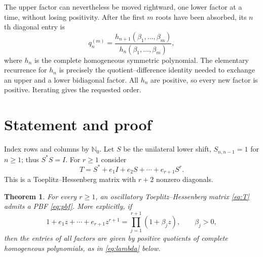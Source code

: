 \documentclass[11pt]{article}
\newtheorem{theorem}{Theorem}
\newcommand{\N}{\mathbb N}
\begin{document}
The upper factor can nevertheless be moved rightward, one lower factor at a
time, without losing positivity.  After the first $m$ roots have been
absorbed, its $n$th diagonal entry is
\[
 q_n^{(m)}=\frac{h_{n+1}(\beta_1,\ldots,\beta_m)}
                  {h_n(\beta_1,\ldots,\beta_m)},
\]
where $h_n$ is the complete homogeneous symmetric polynomial.  The elementary
recurrence for $h_n$ is precisely the quotient--difference identity needed
to exchange an upper and a lower bidiagonal factor.  All $h_n$ are positive,
so every new factor is positive.  Iterating gives the requested order.

\section{Statement and proof}
Index rows and columns by $\N_0$.  Let $S$ be the unilateral lower shift,
$S_{n,n-1}=1$ for $n\ge1$; thus $S^*S=I$.  For $r\ge1$ consider
\[
 T=S^*+e_1I+e_2S+\cdots+e_{r+1}S^r.             \tag{2}\label{eq:T}
\]
This is a Toeplitz--Hessenberg matrix with $r+2$ nonzero diagonals.

\begin{theorem}\label{thm:all}
For every $r\ge1$, an oscillatory Toeplitz--Hessenberg matrix
\eqref{eq:T} admits a PBF \eqref{eq:pbf}.  More explicitly, if
\[
 1+e_1z+\cdots+e_{r+1}z^{r+1}
       =\prod_{j=1}^{r+1}(1+\beta_jz),\qquad \beta_j>0,       \tag{3}\label{eq:edrei}
\]
then the entries of all factors are given by positive quotients of complete
homogeneous polynomials, as in \eqref{eq:lambda} below.
\end{theorem}
\end{document}
